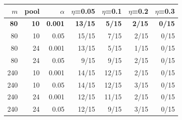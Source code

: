 \begin{tabular}{rrrrrrr}
\toprule
$m$ & pool & $\alpha$ & $\eta$=0.05 & $\eta$=0.1 & $\eta$=0.2 & $\eta$=0.3 \\
\midrule
\textbf{80} & \textbf{10} & \textbf{0.001} & \textbf{13/15} & \textbf{5/15} & \textbf{2/15} & \textbf{0/15} \\
80 & 10 & 0.05 & 15/15 & 7/15 & 2/15 & 0/15 \\
80 & 24 & 0.001 & 13/15 & 5/15 & 1/15 & 0/15 \\
80 & 24 & 0.05 & 9/15 & 9/15 & 2/15 & 0/15 \\
240 & 10 & 0.001 & 14/15 & 12/15 & 2/15 & 0/15 \\
240 & 10 & 0.05 & 14/15 & 12/15 & 3/15 & 0/15 \\
240 & 24 & 0.001 & 12/15 & 11/15 & 2/15 & 0/15 \\
240 & 24 & 0.05 & 12/15 & 9/15 & 3/15 & 0/15 \\
\bottomrule
\end{tabular}
